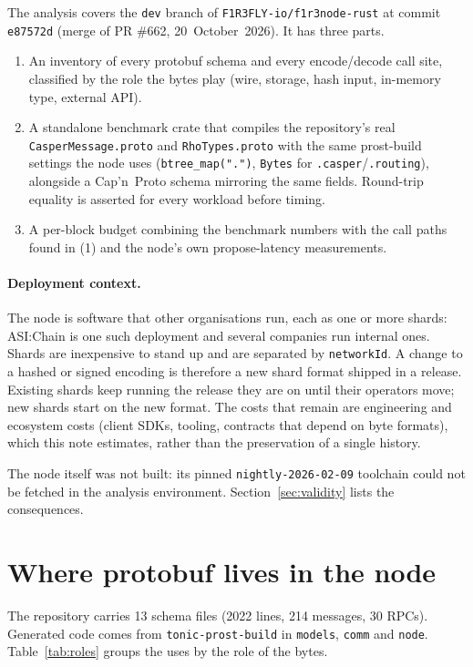 \documentclass[10pt,a4paper]{article}
\newcommand{\f}[1]{\nolinkurl{#1}}
\newcommand{\capnp}{Cap'n~Proto}
\begin{document}
The analysis covers the \f{dev} branch of \f{F1R3FLY-io/f1r3node-rust} at commit \f{e87572d}
(merge of PR \#662, 20~October~2026). It has three parts.
\begin{enumerate}
  \item An inventory of every protobuf schema and every encode/decode call site, classified by the
        role the bytes play (wire, storage, hash input, in-memory type, external API).
  \item A standalone benchmark crate that compiles the repository's real \f{CasperMessage.proto} and
        \f{RhoTypes.proto} with the same prost-build settings the node uses (\f{btree_map(".")},
        \f{Bytes} for \f{.casper}/\f{.routing}), alongside a \capnp{} schema mirroring the same
        fields. Round-trip equality is asserted for every workload before timing.
  \item A per-block budget combining the benchmark numbers with the call paths found in (1) and
        the node's own propose-latency measurements.
\end{enumerate}
\paragraph{Deployment context.} The node is software that other organisations run, each as one or
more shards: ASI:Chain is one such deployment and several companies run internal ones. Shards are
inexpensive to stand up and are separated by \f{networkId}. A change to a hashed or signed encoding
is therefore a new shard format shipped in a release. Existing shards keep running the release
they are on until their operators move; new shards start on the new format. The costs that remain
are engineering and ecosystem costs (client SDKs, tooling, contracts that depend on byte formats),
which this note estimates, rather than the preservation of a single history.

\medskip\noindent The node itself was not built: its pinned \f{nightly-2026-02-09} toolchain could not be fetched in
the analysis environment. Section~\ref{sec:validity} lists the consequences.

\section{Where protobuf lives in the node}

The repository carries 13 schema files (\num{2022} lines, 214 messages, 30 RPCs). Generated code
comes from \f{tonic-prost-build} in \f{models}, \f{comm} and \f{node}. Table~\ref{tab:roles}
groups the uses by the role of the bytes.
\end{document}
